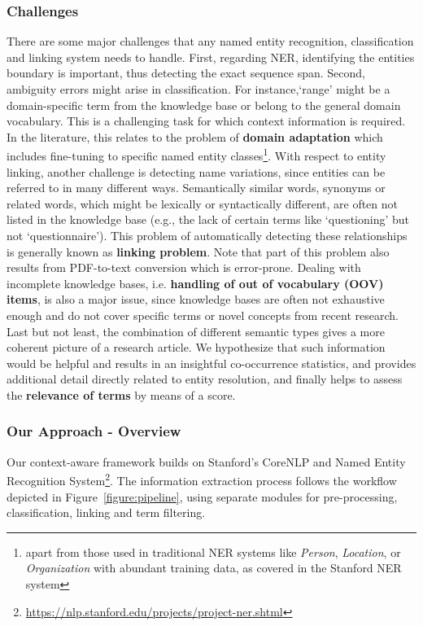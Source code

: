\subsubsection{Challenges}
There are some major challenges that any named entity recognition, classification and linking system needs to handle.
First, regarding NER, identifying the entities boundary is important, thus detecting the exact sequence span. 
Second, ambiguity errors might arise in classification. For instance,`range' might be a domain-specific term from the knowledge base or belong to the general domain vocabulary. This is a challenging task for which context information is required. 
In the literature, this relates to the problem of \textbf{domain adaptation} which includes fine-tuning to specific named entity classes\footnote{apart from those used in traditional NER systems like \textit{Person}, \textit{Location}, or \textit{Organization} with abundant training data, as covered in the Stanford NER system\cite{finkel2005incorporating}}.
With respect to entity linking, another challenge is detecting name variations, since entities can be referred to in many different ways.
Semantically  similar words, synonyms or related words, which might be lexically or syntactically different, are often not listed in the knowledge base 
(e.g., the lack of certain terms like `questioning' but not `questionnaire').  This problem of automatically detecting these relationships is generally known as \textbf{linking problem}. 
Note that part of this problem also results from PDF-to-text conversion which is error-prone. 
Dealing with incomplete knowledge bases, i.e. \textbf{handling of out of vocabulary (OOV) items}, is also a major issue, since 
knowledge bases are often not exhaustive enough and do not cover specific terms or novel concepts from recent research.
Last but not least, the combination of different semantic types gives a more coherent picture of a research article. We hypothesize that such information would be helpful and results in an insightful co-occurrence statistics, and provides additional detail directly related to entity resolution, and finally helps to assess the \textbf{relevance of terms} by means of a score.

 
\subsubsection{Our Approach - Overview} 
Our context-aware framework builds on Stanford’s CoreNLP and Named Entity Recognition System\footnote{\url{https://nlp.stanford.edu/projects/project-ner.shtml}}. 
The information extraction process follows the workflow depicted in Figure~\ref{figure:pipeline}, using separate modules for pre-processing, classification, linking and term filtering.

